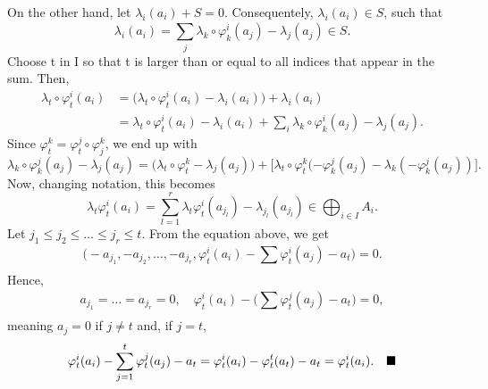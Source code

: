 \documentclass[../category_theory.tex]{subfiles}
\begin{document}
\begin{proof*}
	On the other hand, let \(\lambda_{i}(a_{i})+S=0\). Consequentely, \(\lambda_{i}(a_{i})\in S\), such that
	\[
		\lambda_{i}(a_{i})=\sum\limits_{j}^{}\lambda_{k}\circ \varphi_{k}^{i}(a_{j})-\lambda_{j}(a_{j})\in S.
	\]
	Choose t in I so that t is larger than or equal to all indices that appear in the sum. Then,
	\begin{align*}
		\lambda_{t}\circ \varphi_{t}^{i}(a_{i}) & =\biggl(\lambda_{t}\circ \varphi_{t}^{i}(a_{i})-\lambda_{i}(a_{i})\biggr) + \lambda_{i}(a_{i})                                             \\
		                                        & =\lambda_{t}\circ \varphi_{t}^{i}(a_{i})-\lambda_{i}(a_{i})+ \sum\limits_{i}^{}\lambda_{k}\circ \varphi_{k}^{i}(a_{j})-\lambda_{j}(a_{j}).
	\end{align*}
	Since \(\varphi_{t}^{k}=\varphi_{t}^{j}\circ \varphi_{j}^{k}\), we end up with
	\[
		\lambda_{k}\circ \varphi_{k}^{j}(a_{j})-\lambda_{j}(a_{j})=\biggl(\lambda_{t}\circ \varphi_{t}^{k}-\lambda_{j}(a_{j})\biggr)+\biggl[\lambda_{t}\circ \varphi_{t}^{k}(-\varphi_{k}^{j}(a_{j})-\lambda_{k}(-\varphi_{k}^{j}(a_{j}))\biggr].
	\]
	Now, changing notation, this becomes
	\[
		\lambda_{t}\varphi _{t}^{i}(a_{i})=\sum\limits_{l=1}^{r}\lambda_{t}\varphi_{t}^{i}(a_{j_{l}})-\lambda_{j_{l}}(a_{j_{l}})\in \bigoplus_{i\in I}A_{i}.
	\]
	Let \(j_{1}\leq j_{2}\leq \dotsc \leq j_{r}\leq t\). From the equation above, we get
	\[
		\biggl(-a_{j_{1}}, -a_{j_{2}}, \dotsc, -a_{j_{r}}, \varphi_{t}^{i}(a_{i})-\sum\limits_{}^{}\varphi_{t}^{i}(a_{j})-a_{t}\biggr) = 0.
	\]
	Hence,
	\[
		a_{j_{1}}=\dotsc =a_{j_{r}}=0,\quad \varphi_{t}^{i}(a_{i})-\biggl(\sum\limits_{}^{}\varphi _{t}^{j}(a_{j})-a_{t}\biggr)=0,
	\]
	meaning \(a_{j}=0\) if \(j\neq t\) and, if \(j=t\),
	\[
		\varphi_{t}^{i}(a_{i})-\sum\limits_{j=1}^{t}\varphi_{t}^{j}(a_{j})-a_{t} = \varphi_{t}^{i}(a_{i}) - \varphi_{t}^{t}(a_{t}) - a_{t} = \varphi_{t}^{i}(a_{i}).\quad \text{$\blacksquare$}
	\]
\end{proof*}
\end{document}
